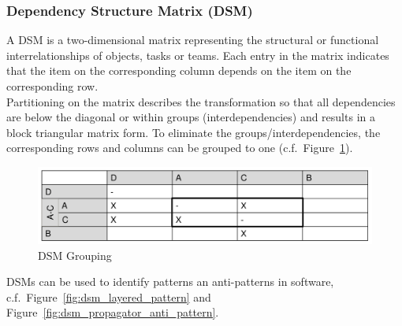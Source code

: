 \subsubsection{Dependency Structure Matrix (DSM)}
A DSM is a two-dimensional matrix representing the structural or functional interrelationships of objects, tasks or teams.
Each entry in the matrix indicates that the item on the corresponding column depends on the item on the corresponding row.\\
Partitioning on the matrix describes the transformation so that all dependencies are below the diagonal or within groups (interdependencies) and results in a block triangular matrix form.
To eliminate the groups/interdependencies, the corresponding rows and columns can be grouped to one (c.f.\ Figure~\ref{fig:dsm_grouping}).
\begin{figure}[h]
  \centering
  \includegraphics[width=.8\textwidth]{images/dsm_grouping.png}
  \caption{DSM Grouping}\label{fig:dsm_grouping}
\end{figure}

DSMs can be used to identify patterns an anti-patterns in software, c.f.\ Figure~\ref{fig:dsm_layered_pattern} and Figure~\ref{fig:dsm_propagator_anti_pattern}.

